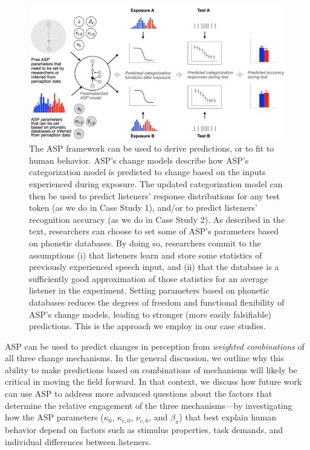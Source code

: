 \documentclass[
  11pt,
  man,floatsintext]{apa6}
\begin{document}
\begin{figure}[h]
\begin{center}
\includegraphics{../figures/diagrams/predictive-power-simulations.png}
\caption{The ASP framework can be used to derive predictions, or to fit to human behavior. ASP's change models describe how ASP's categorization model is predicted to change based on the inputs experienced during exposure. The updated categorization model can then be used to predict listeners' response distributions for any test token (as we do in Case Study 1), and/or to predict listeners' recognition accuracy (as we do in Case Study 2). As described in the text, researchers can choose to set some of ASP's parameters based on phonetic databases. By doing so, researchers commit to the assumptions (i) that listeners learn and store some statistics of previously experienced speech input, and (ii) that the database is a sufficiently good approximation of those statistics for an average listener in the experiment. Setting parameters based on phonetic databases reduces the degrees of freedom and functional flexibility of ASP's change models, leading to stronger (more easily falsifiable) predictions. This is the approach we employ in our case studies.}\label{fig:ASP-predictions}
\end{center}
\end{figure}

ASP can be used to predict changes in perception from \emph{weighted combinations} of all three change mechanisms. In the general discussion, we outline why this ability to make predictions based on combinations of mechanisms will likely be critical in moving the field forward. In that context, we discuss how future work can use ASP to address more advanced questions about the factors that determine the relative engagement of the three mechanisms---by investigating how the ASP parameters (\(\kappa_0\), \(\kappa_{c,0}\), \(\nu_{c,0}\), and \(\beta_{\pi}\)) that best explain human behavior depend on factors such as stimulus properties, task demands, and individual differences between listeners.
\end{document}
